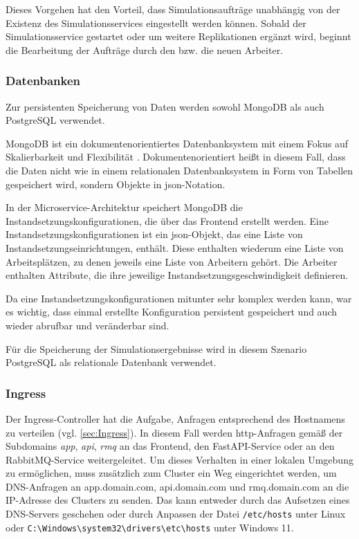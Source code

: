 \documentclass[11pt,a4paper]{article}
\begin{document}
Dieses Vorgehen hat den Vorteil, dass Simulationsaufträge unabhängig von der Existenz
des Simulationsservices eingestellt werden können. Sobald der Simulationsservice gestartet
oder um weitere Replikationen ergänzt wird, beginnt die Bearbeitung der Aufträge durch den
bzw. die neuen Arbeiter.

\subsubsection{Datenbanken}
\label{sec:Datenbanken}
Zur persistenten Speicherung von Daten werden sowohl MongoDB als auch PostgreSQL verwendet.

MongoDB ist ein dokumentenorientiertes Datenbanksystem mit einem Fokus auf Skalierbarkeit und Flexibilität \cite{Bradshaw_2010}.
Dokumentenorientiert heißt in diesem Fall, dass die Daten nicht wie in einem relationalen
Datenbanksystem in Form von Tabellen gespeichert wird, sondern Objekte in json-Notation.

In der Microservice-Architektur speichert MongoDB die Instandsetzungskonfigurationen,
die über das Frontend erstellt werden.
Eine Instandsetzungskonfigurationen ist ein json-Objekt, das eine Liste von Instandsetzungseinrichtungen,
enthält. Diese enthalten wiederum eine Liste von Arbeitsplätzen, zu denen jeweils eine Liste
von Arbeitern gehört. 
Die Arbeiter enthalten Attribute, die ihre jeweilige Instandsetzungsgeschwindigkeit definieren.

Da eine Instandsetzungskonfigurationen mitunter sehr komplex werden kann, war es wichtig,
dass einmal erstellte Konfiguration persistent gespeichert und auch wieder abrufbar und veränderbar sind.

Für die Speicherung der Simulationsergebnisse wird in diesem Szenario PostgreSQL als relationale Datenbank verwendet.

\subsubsection{Ingress}
Der Ingress-Controller hat die Aufgabe, Anfragen entsprechend des Hostnamens zu verteilen (vgl. \ref{sec:Ingress}).
In diesem Fall werden http-Anfragen gemäß der Subdomains \emph{app}, \emph{api}, \emph{rmq} an das
Frontend, den FastAPI-Service oder an den RabbitMQ-Service weitergeleitet. Um dieses Verhalten
in einer lokalen Umgebung zu ermöglichen, muss zusätzlich zum Cluster ein Weg eingerichtet werden,
um DNS-Anfragen an app.domain.com, api.domain.com und rmq.domain.com an die IP-Adresse des Clusters zu senden.
Das kann entweder durch das Aufsetzen eines DNS-Servers geschehen oder durch Anpassen der Datei 
\lstinline|/etc/hosts| unter Linux oder \lstinline|C:\Windows\system32\drivers\etc\hosts| unter Windows 11.
\end{document}
